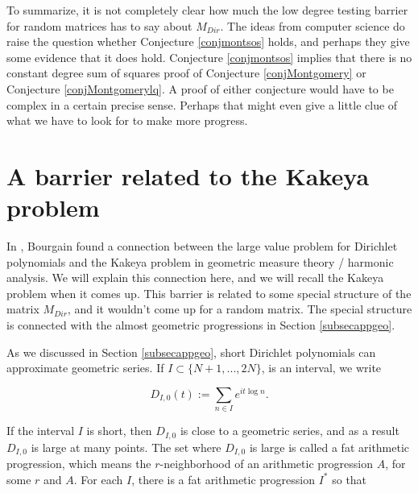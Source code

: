 \documentclass{amsart}
\begin{document}
To summarize,  it is not completely clear how much the low degree testing barrier for random matrices has to say about $M_{Dir}$.   The ideas from computer science do raise the question whether Conjecture \ref{conjmontsos} holds,  and perhaps they give some evidence that it does hold.   Conjecture \ref{conjmontsos} implies that there is no constant degree sum of squares proof of Conjecture \ref{conjMontgomery} or Conjecture \ref{conjMontgomerylq}.   A proof of either conjecture would have to be complex in a certain precise sense.   Perhaps that might even give a little clue of what we have to look for to make more progress.































\section{A barrier related to the Kakeya problem} \label{secbourkak}

In \cite{Bour},  Bourgain found a connection between the large value problem for Dirichlet polynomials and the Kakeya problem in geometric measure theory / harmonic analysis.   We will explain this connection here, and we will recall the Kakeya problem when it comes up.   This barrier is related to some special structure of the matrix $M_{Dir}$,  and it wouldn't come up for a random matrix.   The special structure is connected with the almost geometric progressions in Section \ref{subsecappgeo}. 

As we discussed in Section \ref{subsecappgeo},  short Dirichlet polynomials can approximate geometric series.   If $I \subset \{ N+1, ..., 2N \}$,  is an interval,  we write

$$D_{I, 0}(t) := \sum_{n \in I} e^{ i t \log n}. $$

\noindent If the interval $I$ is short,  then $D_{I,0}$ is close to a geometric series,  and as a result $D_{I,0}$ is large at many points.    The set where $D_{I, 0}$ is large is called a fat arithmetic progression,  which means the $r$-neighborhood of an arithmetic progression $A$,  for some $r$ and $A$.  
For each $I$,  there is a fat arithmetic progression $I^*$ so that
\end{document}
